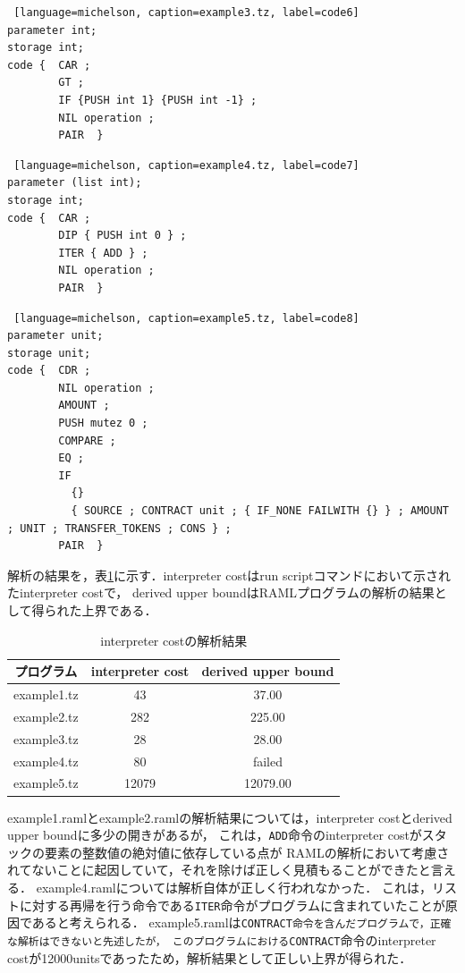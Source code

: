 \documentclass{kuisthesis}
\begin{document}
\begin{lstlisting} [language=michelson, caption=example3.tz, label=code6]
parameter int;
storage int;
code {  CAR ;
        GT ;
        IF {PUSH int 1} {PUSH int -1} ;
        NIL operation ;
        PAIR  }
\end{lstlisting}

\begin{lstlisting} [language=michelson, caption=example4.tz, label=code7]
parameter (list int);
storage int;
code {  CAR ;
        DIP { PUSH int 0 } ;
        ITER { ADD } ;
        NIL operation ;
        PAIR  }
\end{lstlisting}

\begin{lstlisting} [language=michelson, caption=example5.tz, label=code8]
parameter unit;
storage unit;
code {  CDR ;
        NIL operation ;
        AMOUNT ;
        PUSH mutez 0 ;
        COMPARE ;
        EQ ;
        IF
          {}
          { SOURCE ; CONTRACT unit ; { IF_NONE FAILWITH {} } ; AMOUNT ; UNIT ; TRANSFER_TOKENS ; CONS } ;
        PAIR  }
\end{lstlisting}


解析の結果を，表\ref{table1}に示す．interpreter costはrun scriptコマンドにおいて示されたinterpreter costで，
derived upper boundはRAMLプログラムの解析の結果として得られた上界である．

\begin{table}[htb]
  \begin{center}
    \caption{interpreter costの解析結果}
    \begin{tabular}{|c|c|c|} \hline
      プログラム & interpreter cost & derived upper bound \\ \hline \hline
      example1.tz & 43 & 37.00 \\ \hline
      example2.tz & 282 & 225.00 \\ \hline
      example3.tz & 28 & 28.00 \\ \hline
      example4.tz & 80 & failed \\ \hline
      example5.tz & 12079 & 12079.00 \\ \hline
    \end{tabular}
    \label{table1}
  \end{center}
\end{table}

example1.ramlとexample2.ramlの解析結果については，interpreter costとderived upper boundに多少の開きがあるが，
これは，{\tt ADD}命令のinterpreter costがスタックの要素の整数値の絶対値に依存している点が
RAMLの解析において考慮されてないことに起因していて，それを除けば正しく見積もることができたと言える．
example4.ramlについては解析自体が正しく行われなかった．
これは，リストに対する再帰を行う命令である{\tt ITER}命令がプログラムに含まれていたことが原因であると考えられる．
example5.ramlは{\tt CONTRACT命令を含んだプログラムで，正確な解析はできないと先述したが，
このプログラムにおけるCONTRACT}命令のinterpreter costが12000unitsであったため，解析結果として正しい上界が得られた．
\end{document}
